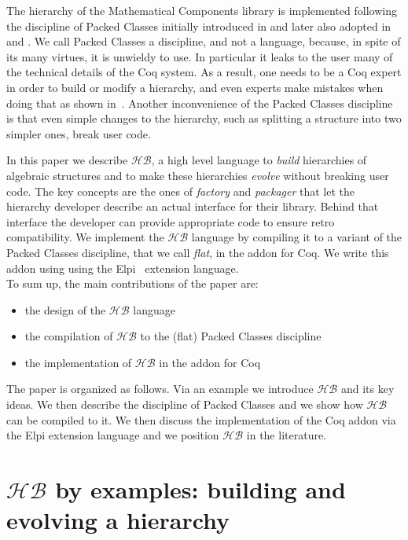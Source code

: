\documentclass[a4paper,UKenglish,cleveref, autoref]{lipics-v2019}
\newcommand{\HB}{\ensuremath{\mathcal{HB}}}
\newcommand{\hb}{\coq{hierarchy-builder}}
\newcommand{\factory}{factory}
\newcommand{\packager}{packager}
\theoremstyle{implem}
\theoremstyle{implem}
\theoremstyle{command}
\begin{document}
The hierarchy of the Mathematical Components library
is implemented following the discipline of Packed Classes initially introduced
in \cite{DBLP:conf/itp/GonthierAABCGRMOBPRSTT13} and later also adopted in
\cite{DBLP:conf/mpc/AffeldtNS19} and \cite{DBLP:journals/mics/BoldoLM15}.
We call Packed Classes a discipline, and not a language, because, in spite of
its many virtues, it is unwieldy to use. In particular it leaks to the user
many of the technical details of the Coq system. As a result, one
needs to be a Coq expert in order to build or modify a hierarchy, and even
experts make mistakes when doing that as shown in~\cite{KSdraft}.
Another inconvenience of the Packed Classes discipline is that even
simple changes to the hierarchy, such as splitting a structure into
two simpler ones, break user code.

In this paper we describe \HB{}, a high level language
to \emph{build} hierarchies of algebraic structures and to make these hierarchies
\emph{evolve} without breaking user code. The key concepts are the ones of
\emph{\factory{}} and \emph{\packager{}} that let the hierarchy developer describe an actual
interface for their library. Behind that interface the developer can provide
appropriate code to ensure retro compatibility.
We implement the \HB{} language by compiling it
to a variant of the Packed Classes discipline, that we call \emph{flat},
in the \hb{} addon for Coq. We write this addon using using the
Elpi~\cite{DBLP:conf/lpar/DunchevGCT15,CoqElpi} extension language.\\

\noindent To sum up, the main contributions of the paper are:
\begin{itemize}
\item the design of the \HB{} language
\item the compilation of \HB{} to the (flat) Packed Classes discipline
\item the implementation of \HB{} in the \hb{} addon for Coq
\end{itemize}
The paper is organized as follows. Via an example we introduce
\HB{} and its key ideas. %
We then describe the discipline
of Packed Classes and we show how \HB{} can be compiled to it.
We then discuss the implementation of the Coq addon via the Elpi extension
language and we position \HB{} in the literature.

\section{\HB{} by examples: building and evolving a hierarchy}
\label{sec:example}
\end{document}
